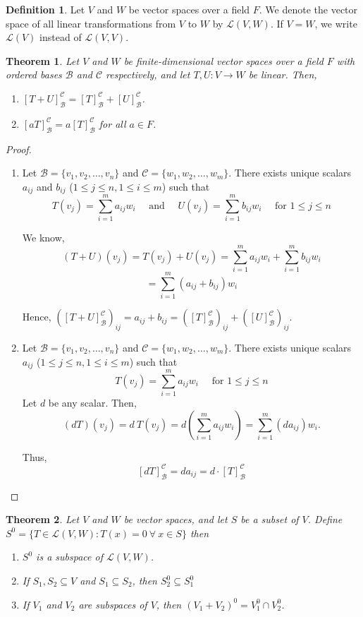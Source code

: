 \documentclass[12pt, a4paper]{article}
\newtheorem{theorem}{Theorem}[section]
\theoremstyle{definition}
\newtheorem{definition}{Definition}[section]
\theoremstyle{remark}
\newcommand{\B}{\mathscr{B}}
\newcommand{\C}{\mathscr{C}}
\newcommand{\LL}{\mathscr{L}}
\begin{document}
\begin{definition}
    Let $V$ and $W$ be vector spaces over a field $F$. We denote the vector space of all linear transformations from $V$ to $W$ by $\LL(V,W)$. If $V=W$, we write $\LL(V)$ instead of $\LL(V,V)$.
\end{definition}

\begin{theorem}
    Let $V$ and $W$ be finite-dimensional vector spaces over a field $F$ with ordered bases $\B$ and $\C$ respectively, and let $T,U: V \to W$ be linear. Then,
    \begin{enumerate}
        \item $[T+U]_\B^\C = [T]_\B^\C + [U]_\B^\C$.
        \item $[aT]_\B^\C = a[T]_\B^\C$ for all $a \in F$.
    \end{enumerate}
\end{theorem}

\begin{proof}
    \begin{enumerate}
        \item Let $\B = \{v_1, v_2, \dots, v_n\}$ and $\C = \{w_1, w_2, \dots, w_m\}$. There exists unique scalars $a_{ij}$ and $b_{ij}$ ($1 \le j \le n, 1 \le i \le m$) such that
        $$T(v_j) = \sum_{i=1}^{m} a_{ij} w_i \quad \text{ and } \quad U(v_j) = \sum_{i=1}^{m} b_{ij} w_i \quad \text{ for } 1 \le j \le n$$

        We know,
        $$(T+U)(v_j) = T(v_j) + U(v_j) = \sum_{i=1}^{m} a_{ij} w_i + \sum_{i=1}^{m} b_{ij} w_i$$
        $$= \sum_{i=1}^{m} (a_{ij} + b_{ij}) w_i$$

        Hence, $\left([T+U]_\B^\C\right)_{ij} = a_{ij} + b_{ij} = \left([T]_\B^\C\right)_{ij} + \left([U]_\B^\C\right)_{ij}.$

        \item Let $\B = \{v_1, v_2, \dots, v_n\}$ and $\C = \{w_1, w_2, \dots, w_m\}$. There exists unique scalars $a_{ij}$ ($1 \le j \le n, 1 \le i \le m$) such that
        $$T(v_j) = \sum_{i=1}^{m} a_{ij} w_i \quad \text{ for } 1 \le j \le n$$
        Let $d$ be any scalar. Then,
        $$(dT)(v_j) = d \ T(v_j) = d \left( \sum_{i=1}^{m} a_{ij} w_i \right) = \sum_{i=1}^{m} (da_{ij}) w_i.$$

        Thus,
        $$[dT]_\B^\C = d a_{ij} = d \cdot [T]_\B^\C$$
    \end{enumerate}
\end{proof}

\begin{theorem}
    Let $V$ and $W$ be vector spaces, and let $S$ be a subset of $V$. Define $S^0 = \{T \in \LL(V,W) : T(x) = 0 \ \forall \ x \in S\}$ then
    \begin{enumerate}
    \item $S^0$ is a subspace of $\LL(V,W)$.
    \item If $S_1, S_2 \subseteq V$ and $S_1 \subseteq S_2$, then $S_2^0 \subseteq S_1^0$
    \item If $V_1$ and $V_2$ are subspaces of $V$, then $(V_1 + V_2)^0 = V_1^0 \cap V_2^0$.
    \end{enumerate}
\end{theorem}
\end{document}
